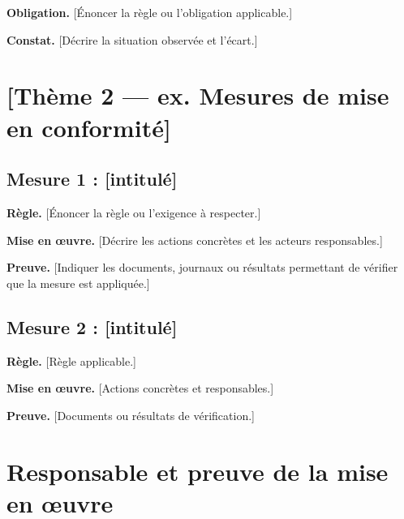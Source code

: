 \documentclass[a4paper,10pt]{article}
\begin{document}
  \textbf{Obligation.} [Énoncer la règle ou l'obligation applicable.]

  \textbf{Constat.} [Décrire la situation observée et l'écart.]

  \section{[Thème 2 — ex. Mesures de mise en conformité]}


  \subsection{Mesure 1 : [intitulé]}

  \textbf{Règle.} [Énoncer la règle ou l'exigence à respecter.]

  \textbf{Mise en œuvre.} [Décrire les actions concrètes et les acteurs responsables.]

  \textbf{Preuve.} [Indiquer les documents, journaux ou résultats permettant
  de vérifier que la mesure est appliquée.]

  \subsection{Mesure 2 : [intitulé]}

  \textbf{Règle.} [Règle applicable.]

  \textbf{Mise en œuvre.} [Actions concrètes et responsables.]

  \textbf{Preuve.} [Documents ou résultats de vérification.]

  \section{Responsable et preuve de la mise en œuvre}
\end{document}
